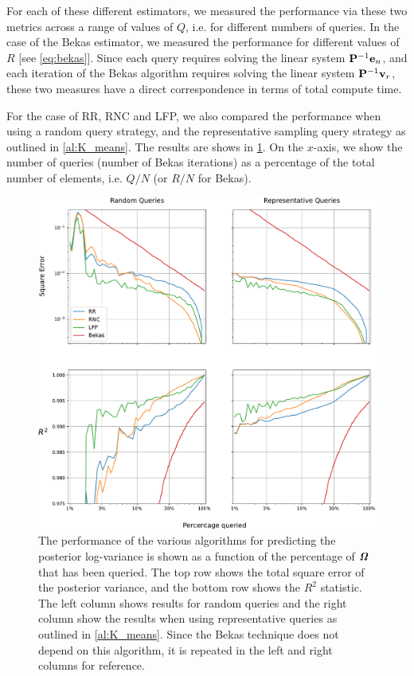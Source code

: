 For each of these different estimators, we measured the performance via these two metrics across a range of values of $Q$, i.e. for different numbers of queries. In the case of the Bekas estimator, we measured the performance for different values of $R$ [see \cref{eq:bekas}]. Since each query requires solving the linear system $\mathbf{P}^{-1}\mathbf{e}_n$, and each iteration of the Bekas algorithm requires solving the linear system $\mathbf{P}^{-1}\mathbf{v}_r$, these two measures have a direct correspondence in terms of total compute time. 

For the case of RR, RNC and LFP, we also compared the performance when using a random query strategy, and the representative sampling query strategy as outlined in \cref{al:K_means}. The results are shows in \cref{fig:var_solvers}. On the $x$-axis, we show the number of queries (number of Bekas iterations) as a percentage of the total number of elements, i.e. $Q/N$ (or $R/N$ for Bekas). 


\begin{figure}[t] 
    \begin{center}
        \includegraphics[width=\linewidth]{Figures/VarSolvers.pdf}
    \end{center}
   \caption[Performance of various algorithms for predicting the posterior log-variance]{The performance of the various algorithms for predicting the posterior log-variance is shown as a function of the percentage of $\bm{\mathit{\Omega}}$ that has been queried. The top row shows the total square error of the posterior variance, and the bottom row shows the $R^2$ statistic. The left column shows results for random queries and the right column show the results when using representative queries as outlined in \cref{al:K_means}. Since the Bekas technique does not depend on this algorithm, it is repeated in the left and right columns for reference. } 
    \label{fig:var_solvers}
\end{figure} 

